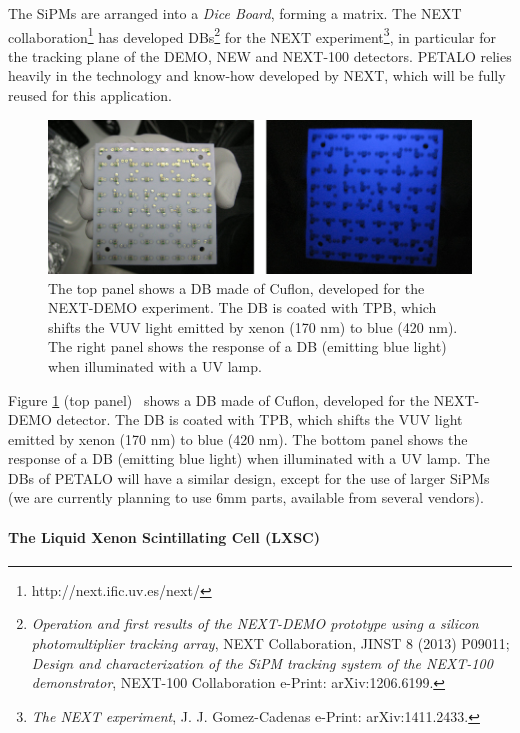 The SiPMs are arranged into a {\em Dice Board}, forming a matrix.
The NEXT collaboration\footnote{http://next.ific.uv.es/next/} has developed DBs\footnote{{\em
Operation and first results of the NEXT-DEMO prototype using a silicon photomultiplier tracking array}, 
NEXT Collaboration, JINST 8 (2013) P09011; {\em	
Design and characterization of the SiPM tracking system of the NEXT-100 demonstrator}, 
NEXT-100 Collaboration 
e-Print: arXiv:1206.6199. } for the NEXT experiment\footnote{
{\em The NEXT experiment},
J. J. Gomez-Cadenas e-Print: arXiv:1411.2433. }, in particular for the tracking plane of the DEMO, NEW and NEXT-100 detectors. PETALO relies heavily in the technology and know-how developed by NEXT, which will be fully reused for this application. 

\begin{figure}[!htb]
	\centering
	\includegraphics[scale=0.5]{img/DC.png}
	\caption{\label{fig.DB} The top panel shows a DB made of Cuflon, developed for the NEXT-DEMO experiment. The DB is coated with TPB, which shifts the VUV light emitted by xenon (170 nm) to blue (420 nm). The right panel shows the response of a DB (emitting blue light) when illuminated with a UV lamp.  }
\end{figure}


Figure \ref{fig.DB} (top panel) ~shows a DB made of Cuflon, developed for the NEXT-DEMO detector. The DB is coated with TPB, which shifts the VUV light emitted by xenon (170 nm) to blue (420 nm). The bottom panel shows the response of a DB (emitting blue light) when illuminated with a UV lamp. The DBs of PETALO will have a similar design, except for the use of larger SiPMs (we are currently planning to use 6mm parts, available from several vendors).

\paragraph{The Liquid Xenon Scintillating Cell (LXSC)}


